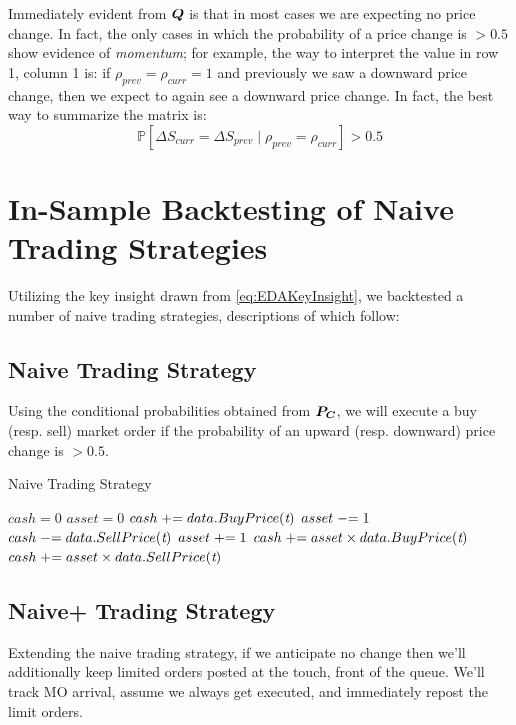 Immediately evident from $\boldsymbol{Q}$ is that in most cases we are expecting no price change. In fact, the only cases in which the probability of a price change is $>0.5$ show evidence of \textit{momentum}; for example, the way to interpret the value in row 1, column 1 is: if $\rho_{prev} = \rho_{curr} = 1$ and previously we saw a downward price change, then we expect to again see a downward price change. In fact, the best way to summarize the matrix is:
\begin{equation}\label{eq:EDAKeyInsight}
\mathbb{P} \left[ \Delta S_{curr} = \Delta S_{prev} \; | \; \rho_{prev} = \rho_{curr} \right] > 0.5
\end{equation} 

\section{In-Sample Backtesting of Naive Trading Strategies}
Utilizing the key insight drawn from \eqref{eq:EDAKeyInsight}, we backtested a number of naive trading strategies, descriptions of which follow:

\subsection{Naive Trading Strategy}  Using the conditional probabilities obtained from $\boldsymbol{P_C}$, we will execute a buy (resp. sell) market order if the probability of an upward (resp. downward) price change is $> 0.5$.

\begin{algorithm}[H]
\caption{Naive Trading Strategy}
\begin{algorithmic}[1]
\State $cash = 0$
\State $asset = 0$
		\State $cash \mathrel{+}= data.BuyPrice(\textit{t})$
		\State $asset \mathrel{-}= 1$
		\State $cash \mathrel{-}= data.SellPrice(\textit{t})$	
		\State $asset \mathrel{+}= 1$
	\EndIf
\EndFor
{} 
	\State $cash \mathrel{+}= asset \times data.BuyPrice(\textit{t})$
	\State $cash \mathrel{+}= asset \times data.SellPrice(\textit{t})$	
\EndIf
\end{algorithmic}
\end{algorithm}

\subsection{Naive+ Trading Strategy} Extending the naive trading strategy, if we anticipate no change then we'll additionally keep limited orders posted at the touch, front of the queue. We'll track MO arrival, assume we always get executed, and immediately repost the limit orders.

